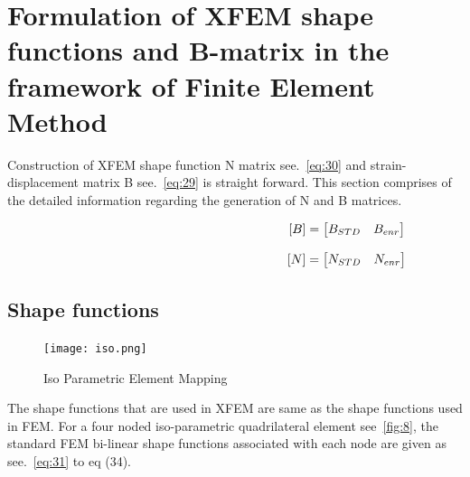 \documentclass[fleqn, 12.5pt,a4paper]{report}
\begin{document}
\section{ \large{Formulation of XFEM shape functions and B-matrix in the framework of Finite Element Method}}

Construction of XFEM shape function N matrix see.~\autoref{eq:30} and strain-displacement matrix B  see.~\autoref{eq:29} is straight forward. This section comprises of the detailed information regarding the generation of N and B matrices.

\begin{align}\label{eq:29}
\hspace{6.25cm}[B] = \begin{bmatrix}
B_{STD} & B_{enr}
\end{bmatrix}
\end{align}

\begin{align}\label{eq:30}
\hspace{6.25cm}[N] = 
\begin{bmatrix}
N_{STD} & N_{enr}
\end{bmatrix}   
\end{align}


\subsection{Shape functions}

\begin{figure}[h]
    \centering
    \texttt{[image: iso.png]}
    \caption{Iso Parametric Element Mapping}\cite{sukumar2003modeling}
    \label{fig:8}
\end{figure}

The shape functions that are used in XFEM are same as the shape functions used in FEM. For a four noded iso-parametric quadrilateral element   see~\autoref{fig:8}, the standard FEM bi-linear shape functions  \cite{khoei2014extended}associated with each node are given as see.~\autoref{eq:31} to eq (34).
\end{document}
